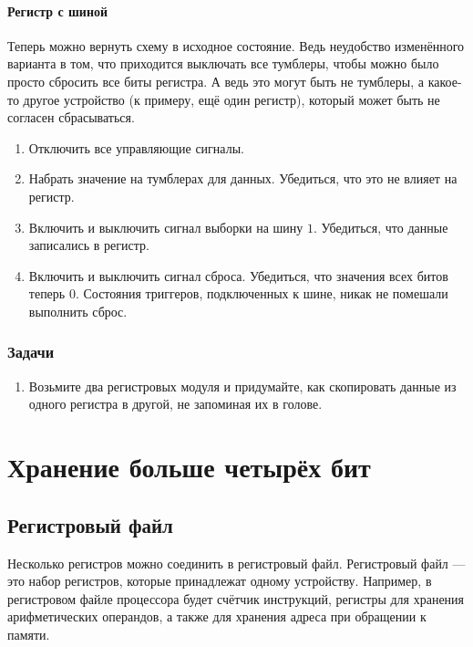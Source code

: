 \subsubsection{Регистр с шиной}

Теперь можно вернуть схему в исходное состояние. Ведь неудобство изменённого варианта
в том, что приходится выключать все тумблеры, чтобы можно было просто сбросить все биты регистра.
А ведь это могут быть не тумблеры, а какое-то другое устройство (к примеру, ещё один
регистр), который может быть не согласен сбрасываться.

\begin{enumerate}
    \item Отключить все управляющие сигналы.
    \item Набрать значение на тумблерах для данных. Убедиться, что это не влияет на регистр.
    \item Включить и выключить сигнал выборки на шину $1$. Убедиться, что данные записались в регистр.
    \item Включить и выключить сигнал сброса. Убедиться, что значения всех битов теперь $0$.
          Состояния триггеров, подключенных к шине, никак не помешали выполнить сброс.
\end{enumerate}

\subsection{Задачи}

\begin{enumerate}
    \item Возьмите два регистровых модуля и придумайте,
          как скопировать данные из одного регистра в другой, не запоминая их в голове.
\end{enumerate}


\chapter{Хранение больше четырёх бит}

\section{Регистровый файл}

Несколько регистров можно соединить в регистровый файл.
Регистровый файл --- это набор регистров, которые принадлежат одному устройству.
Например, в регистровом файле процессора будет счётчик инструкций,
регистры для хранения арифметических операндов, а также для хранения адреса
при обращении к памяти.

